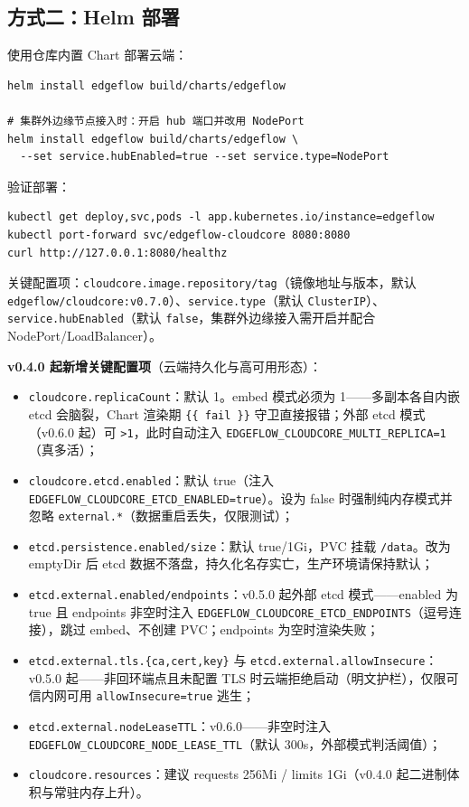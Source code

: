\subsection{方式二：Helm 部署}

使用仓库内置 Chart 部署云端：

\begin{lstlisting}
helm install edgeflow build/charts/edgeflow

# 集群外边缘节点接入时：开启 hub 端口并改用 NodePort
helm install edgeflow build/charts/edgeflow \
  --set service.hubEnabled=true --set service.type=NodePort
\end{lstlisting}

验证部署：

\begin{lstlisting}
kubectl get deploy,svc,pods -l app.kubernetes.io/instance=edgeflow
kubectl port-forward svc/edgeflow-cloudcore 8080:8080
curl http://127.0.0.1:8080/healthz
\end{lstlisting}

关键配置项：\texttt{cloudcore.image.repository/tag}（镜像地址与版本，默认 \texttt{edgeflow/cloudcore:v0.7.0}）、\texttt{service.type}（默认 \texttt{ClusterIP}）、\texttt{service.hubEnabled}（默认 \texttt{false}，集群外边缘接入需开启并配合 NodePort/LoadBalancer）。

\textbf{v0.4.0 起新增关键配置项}（云端持久化与高可用形态）：

\begin{itemize}
  \item \texttt{cloudcore.replicaCount}：默认 1。embed 模式必须为 1——多副本各自内嵌 etcd 会脑裂，Chart 渲染期 \texttt{\{\{ fail \}\}} 守卫直接报错；外部 etcd 模式（v0.6.0 起）可 \texttt{>1}，此时自动注入 \texttt{EDGEFLOW\_CLOUDCORE\_MULTI\_REPLICA=1}（真多活）；
  \item \texttt{cloudcore.etcd.enabled}：默认 true（注入 \texttt{EDGEFLOW\_CLOUDCORE\_ETCD\_ENABLED=true}）。设为 false 时强制纯内存模式并忽略 \texttt{external.*}（数据重启丢失，仅限测试）；
  \item \texttt{etcd.persistence.enabled/size}：默认 true/1Gi，PVC 挂载 \texttt{/data}。改为 emptyDir 后 etcd 数据不落盘，持久化名存实亡，生产环境请保持默认；
  \item \texttt{etcd.external.enabled/endpoints}：v0.5.0 起外部 etcd 模式——enabled 为 true 且 endpoints 非空时注入 \texttt{EDGEFLOW\_CLOUDCORE\_ETCD\_ENDPOINTS}（逗号连接），跳过 embed、不创建 PVC；endpoints 为空时渲染失败；
  \item \texttt{etcd.external.tls.\{ca,cert,key\}} 与 \texttt{etcd.external.allowInsecure}：v0.5.0 起——非回环端点且未配置 TLS 时云端拒绝启动（明文护栏），仅限可信内网可用 \texttt{allowInsecure=true} 逃生；
  \item \texttt{etcd.external.nodeLeaseTTL}：v0.6.0——非空时注入 \texttt{EDGEFLOW\_CLOUDCORE\_NODE\_LEASE\_TTL}（默认 300s，外部模式判活阈值）；
  \item \texttt{cloudcore.resources}：建议 requests 256Mi / limits 1Gi（v0.4.0 起二进制体积与常驻内存上升）。
\end{itemize}

